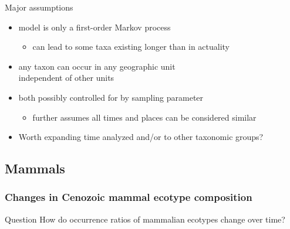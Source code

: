 \documentclass{beamer}
\begin{document}
\begin{frame}
  \begin{block}{Major assumptions}
    \begin{itemize}
      \item model is only a first-order Markov process
        \begin{itemize}
          \item can lead to some taxa existing longer than in actuality
        \end{itemize}
      \item any taxon can occur in any geographic unit \\independent of other units
      \item both possibly controlled for by sampling parameter
        \begin{itemize}
          \item further assumes all times and places can be considered similar
        \end{itemize}
      \item Worth expanding time analyzed and/or to other taxonomic groups?
    \end{itemize}
  \end{block}
\end{frame}

\subsection{Mammals}
\begin{frame}
  \frametitle{Changes in Cenozoic mammal ecotype composition}

  \begin{alertblock}{Question}
    How do occurrence ratios of mammalian ecotypes change over time?
  \end{alertblock}
\end{frame}
\end{document}
